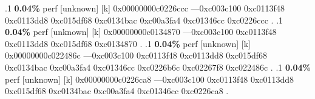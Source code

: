 \begin{profile}
{.1 \textbf{ 0.04\%} perf             [unknown]              [k] 0x00000000c0226ccc\newline {} ---0xc003c100\newline {} 0xc0113f48\newline {} 0xc0113dd8\newline {} 0xc015df68\newline {} 0xc0134bac\newline {} 0xc00a3fa4\newline {} 0xc01346cc\newline {} 0xc0226ccc\newline {} . 
.1 \textbf{ 0.04\%} perf             [unknown]              [k] 0x00000000c0134870\newline {} ---0xc003c100\newline {} 0xc0113f48\newline {} 0xc0113dd8\newline {} 0xc015df68\newline {} 0xc0134870\newline {} . 
.1 \textbf{ 0.04\%} perf             [unknown]              [k] 0x00000000c022486c\newline {} ---0xc003c100\newline {} 0xc0113f48\newline {} 0xc0113dd8\newline {} 0xc015df68\newline {} 0xc0134bac\newline {} 0xc00a3fa4\newline {} 0xc01346cc\newline {} 0xc0226b6c\newline {} 0xc02267f8\newline {} 0xc022486c\newline {} . 
.1 \textbf{ 0.04\%} perf             [unknown]              [k] 0x00000000c0226ca8\newline {} ---0xc003c100\newline {} 0xc0113f48\newline {} 0xc0113dd8\newline {} 0xc015df68\newline {} 0xc0134bac\newline {} 0xc00a3fa4\newline {} 0xc01346cc\newline {} 0xc0226ca8\newline {} . 
}
\end{profile}

